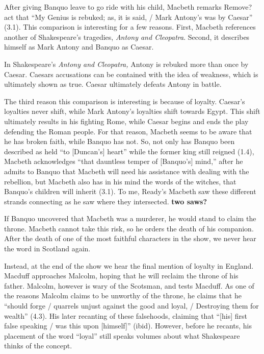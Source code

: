 \documentclass[12pt]{article}[titlepage]
\newcommand{\say}[1]{``#1''}
\newcommand{\1}{\={a}}
\newcommand{\2}{\={e}}
\newcommand{\3}{\={\i}}
\newcommand{\4}{\=o}
\newcommand{\5}{\=u}
\newcommand{\6}{\={A}}
\renewcommand{\,}{\textsuperscript{,}}
\begin{document}
After giving Banquo leave to go ride with his child, Macbeth remarks {Remove?} act that \say{My Genius is rebuked; as, it is said, / Mark Antony's was by Caesar} (3.1).
This comparison is interesting for a few reasons.
First, Macbeth references another of Shakespeare's tragedies, \textit{Antony and Cleopatra}.
Second, it describes himself as Mark Antony and Banquo as Caesar.

In Shakespeare's \textit{Antony and Cleopatra,} Antony is rebuked more than once by Caesar.
Caesars accusations can be contained with the idea of weakness, which is ultimately shown as true.
Caesar ultimately defeats Antony in battle.

The third reason this comparison is interesting is because of loyalty.
Caesar's loyalties never shift, while Mark Antony's loyalties shift towards Egypt.
This shift ultimately results in his fighting Rome, while Caesar begins and ends the play defending the Roman people.
For that reason, Macbeth seems to be aware that he has broken faith, while Banquo has not.
So, not only has Banquo been described as held \say{to [Duncan's] heart} while the former king still reigned (1.4), Macbeth acknowledges \say{that dauntless temper of [Banquo's] mind,} after he admits to Banquo that Macbeth will need his assistance with dealing with the rebellion, but Macbeth also has in his mind the words of the witches, that Banquo's children will inherit (3.1).
To me, Ready's Macbeth saw these different strands connecting as he saw where they intersected. \textbf{two saws?}

If Banquo uncovered that Macbeth was a murderer, he would stand to claim the throne.
Macbeth cannot take this risk, so he orders the death of his companion.
After the death of one of the most faithful characters in the show, we never hear the word in Scotland again.

Instead, at the end of the show we hear the final mention of loyalty in England.
Macduff approaches Malcolm, hoping that he will reclaim the throne of his father.
Malcolm, however is wary of the Scotsman, and tests Macduff.
As one of the reasons Malcolm claims to be unworthy of the throne, he claims that he \say{should forge / quarrels unjust against the good and loyal, / Destroying them for wealth} (4.3).
His later recanting of these falsehoods, claiming that \say{[his] first false speaking / was this upon [himself]} (ibid).
However, before he recants, his placement of the word \say{loyal} still speaks volumes about what Shakespeare thinks of the concept.
\end{document}
